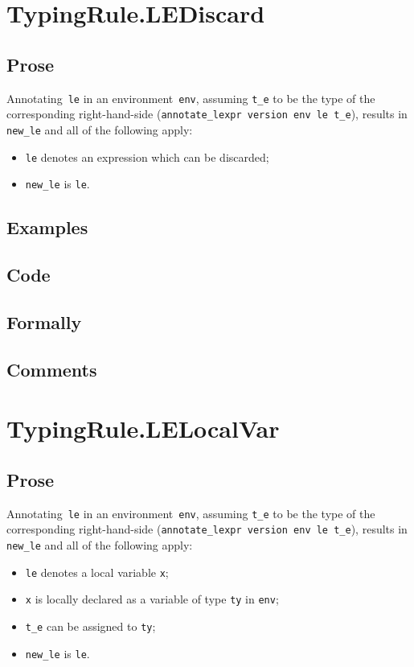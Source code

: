 \documentclass{book}
\begin{document}
\section{TypingRule.LEDiscard \label{sec:TypingRule.LEDiscard}}

  \subsection{Prose}
   Annotating~\texttt{le} in an environment~\texttt{env}, assuming
\texttt{t\_e} to be the type of the corresponding right-hand-side
(\texttt{annotate\_lexpr version env le t\_e}), results in \texttt{new\_le} and
all of the following apply:
   \begin{itemize}
   \item \texttt{le} denotes an expression which can be discarded;
   \item \texttt{new\_le} is \texttt{le}.
   \end{itemize}

  \subsection{Examples}

  \subsection{Code}

  \subsection{Formally}

  \subsection{Comments}

\section{TypingRule.LELocalVar \label{sec:TypingRule.LELocalVar}}

   \subsection{Prose}
   Annotating~\texttt{le} in an environment~\texttt{env}, assuming
\texttt{t\_e} to be the type of the corresponding right-hand-side
(\texttt{annotate\_lexpr version env le t\_e}), results in \texttt{new\_le} and
all of the following apply:
   \begin{itemize}
   \item \texttt{le} denotes a local variable \texttt{x};
   \item \texttt{x} is locally declared as a variable of type \texttt{ty} in \texttt{env};
   \item \texttt{t\_e} can be assigned to \texttt{ty};
   \item \texttt{new\_le} is \texttt{le}.
   \end{itemize}
\end{document}
